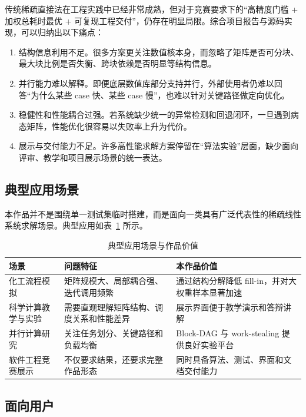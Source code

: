\documentclass[12pt,a4paper,fontset=none]{ctexart}
\begin{document}
传统稀疏直接法在工程实践中已经非常成熟，但对于竞赛要求下的“高精度门槛 + 加权总耗时最优 + 可复现工程交付”，仍存在明显局限。综合项目报告与源码实现，可以归纳出以下痛点：
\begin{enumerate}
  \item 结构信息利用不足。很多方案更关注数值核本身，而忽略了矩阵是否可分块、最大块比例是否失衡、跨块依赖是否明显等结构信息。
  \item 并行能力难以解释。即便底层数值库部分支持并行，外部使用者仍难以回答“为什么某些 case 快、某些 case 慢”，也难以针对关键路径做定向优化。
  \item 稳健性和性能耦合过强。若系统缺少统一的异常检测和回退闭环，一旦遇到病态矩阵，性能优化很容易以失败率上升为代价。
  \item 展示与交付能力不足。许多高性能求解方案停留在“算法实验”层面，缺少面向评审、教学和项目展示场景的统一表达。
\end{enumerate}

\subsection{典型应用场景}

本作品并不是围绕单一测试集临时搭建，而是面向一类具有广泛代表性的稀疏线性系统求解场景。典型应用如表~\ref{tab:scenes} 所示。

\begin{table}[H]
\centering
\caption{典型应用场景与作品价值}
\label{tab:scenes}
\begin{tabular}{p{3.2cm}p{4.0cm}p{5.6cm}}
\toprule
场景 & 问题特征 & 本作品价值 \\
\midrule
化工流程模拟 & 矩阵规模大、局部耦合强、迭代调用频繁 & 通过结构分解降低 fill-in，并对大权重样本显著加速 \\
科学计算教学与实验 & 需要直观理解矩阵结构、调度关系和性能差异 & 展示界面便于教学演示和答辩讲解 \\
并行计算研究 & 关注任务划分、关键路径和负载均衡 & Block-DAG 与 work-stealing 提供良好实验平台 \\
软件工程竞赛展示 & 不仅要求结果，还要求完整作品形态 & 同时具备算法、测试、界面和文档交付能力 \\
\bottomrule
\end{tabular}
\end{table}

\subsection{面向用户}
\end{document}
